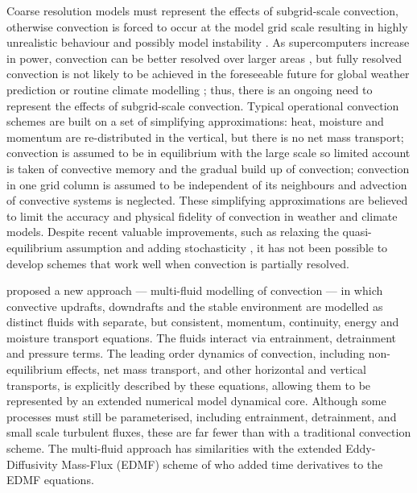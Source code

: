 \documentclass[11pt,a4paper]{article}
\begin{document}
Coarse resolution models must represent the effects of subgrid-scale convection, otherwise convection is forced to occur at the model grid scale resulting in highly unrealistic behaviour and possibly model instability \cite[]{PY15}.
As supercomputers increase in power, convection can be better resolved over larger areas \cite[e.g.][]{GC17}, but fully resolved convection is not likely to be achieved in the foreseeable future for global weather prediction or routine climate modelling \cite[e.g.][]{SSJ+19}; thus, there is an ongoing need to represent the effects of subgrid-scale convection.
Typical operational convection schemes are built on a set of simplifying approximations: heat, moisture and momentum are re-distributed in the vertical, but there is no net mass transport; convection is assumed to be in equilibrium with the large scale so limited account is taken of convective memory and the gradual build up of convection; convection in one grid column is assumed to be independent of its neighbours and advection of convective systems is neglected. These simplifying approximations are believed to limit the accuracy and physical fidelity of
convection in weather and climate models. Despite recent valuable improvements, such as relaxing the quasi-equilibrium assumption \cite[]{PR98,GG05,Par14} and adding stochasticity \cite[]{PC08}, it has not been possible to develop schemes that work well when convection is partially resolved.

\cite{TWV+18} proposed a new approach --- multi-fluid modelling of convection --- in which convective updrafts, downdrafts and the stable environment are modelled as distinct fluids with separate, but consistent, momentum, continuity, energy and moisture transport equations. The fluids interact via entrainment, detrainment and pressure terms. 
The leading order dynamics of convection, including non-equilibrium effects, net mass transport, and other horizontal and vertical transports, is explicitly described by these equations, allowing them to be represented by
an extended numerical model dynamical core. Although some processes must still be parameterised, including entrainment,
detrainment, and small scale turbulent fluxes, these are far fewer than with a traditional convection scheme.
The multi-fluid approach has similarities with the extended Eddy-Diffusivity Mass-Flux (EDMF) scheme of \cite{TKP+18} who added time derivatives to the EDMF equations.
\end{document}
